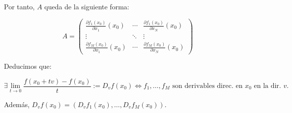 \documentclass[11pt, a4paper, titlepage]{article}
\theoremstyle{theorem-style}
\theoremstyle{definition-style}
\theoremstyle{remark-style}
\theoremstyle{example-style}
\begin{document}
Por tanto, $A$ queda de la siguiente forma:

\[
	A = \begin{pmatrix}
	\frac{\partial f_1(x_0)}{\partial x_1} (x_0) & \cdots & \frac{\partial f_1(x_0)}{\partial x_N} (x_0)\\
	\vdots & \ddots & \vdots\\
	\frac{\partial f_M(x_0)}{\partial x_1} (x_0) & \cdots & \frac{\partial f_M(x_0)}{\partial x_N} (x_0)
\end{pmatrix}
\]

Deducimos que:

\[
	\exists \lim_{t\to 0} \frac{f(x_0+tv) - f(x_0)}{t} := D_vf(x_0) \iff f_1, \dots, f_M \text{ son derivables direc. en $x_0$ en la dir. $v$.}
\]

Además, $D_vf(x_0) = (D_vf_1(x_0), \dots, D_vf_M(x_0))$.
\end{document}
